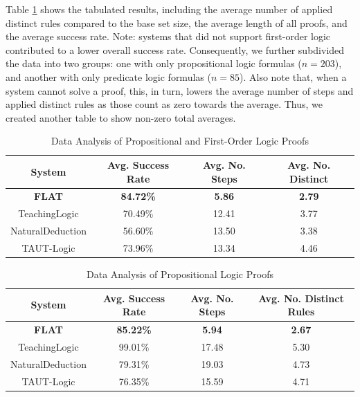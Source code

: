 \documentclass[ms]{uncgdissertationexp2}
\theoremstyle{plain}
\theoremstyle{definition}
\theoremstyle{remark}
\begin{document}
Table \ref{table:allData} shows the tabulated results, including the average number of applied distinct rules compared to the base set size, the average length of all proofs, and the average success rate. Note: systems that did not support first-order logic contributed to a lower overall success rate. Consequently, we further subdivided the data into two groups: one with only propositional logic formulas ($n=203$), and another with only predicate logic formulas ($n=85$). Also note that, when a system cannot solve a proof, this, in turn, lowers the average number of steps and applied distinct rules as those count as zero towards the average. Thus, we created another table to show non-zero total averages.
\begin{table}[!ht]
	\centering
	\caption{Data Analysis of Propositional and First-Order Logic Proofs}
	\begin{tabularx}{\textwidth}{*4c}
		\toprule
		System           & Avg. Success Rate & Avg. No. Steps & Avg. No. Distinct \\    
		\midrule
		\textbf{FLAT}    & \textbf{84.72\%}  & \textbf{5.86}  & \textbf{2.79}     \\
		TeachingLogic    & 70.49\%           & 12.41          & 3.77              \\
		NaturalDeduction & 56.60\%           & 13.50          & 3.38              \\
		TAUT-Logic       & 73.96\%           & 13.34          & 4.46              \\
		\bottomrule
	\end{tabularx}
	\label{table:allData}
\end{table}

\begin{table}[!ht]
	\centering
	\caption{Data Analysis of Propositional Logic Proofs}
	\begin{tabularx}{\textwidth}{*4c}
		\toprule
		System           & Avg. Success Rate & Avg. No. Steps & Avg. No. Distinct Rules \\    
		\midrule
		\textbf{FLAT}    & \textbf{85.22\%}  & \textbf{5.94}  & \textbf{2.67}           \\
		TeachingLogic    & 99.01\%           & 17.48          & 5.30                    \\
		NaturalDeduction & 79.31\%           & 19.03          & 4.73                    \\
		TAUT-Logic       & 76.35\%           & 15.59          & 4.71                    \\
		\bottomrule
	\end{tabularx}
	\label{table:propData}
\end{table}
\end{document}
